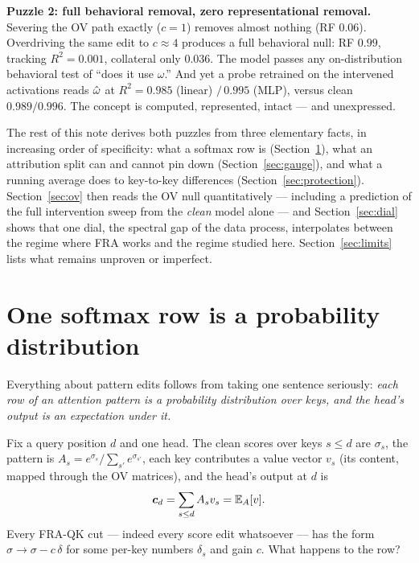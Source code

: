 \documentclass{article}
\begin{document}
\textbf{Puzzle 2: full behavioral removal, zero representational removal.} Severing the OV path exactly ($c = 1$) removes almost nothing (RF $0.06$). Overdriving the same edit to $c \approx 4$ produces a full behavioral null: RF $0.99$, tracking $R^2 = 0.001$, collateral only $0.036$. The model passes any on-distribution behavioral test of ``does it use $\omega$.'' And yet a probe retrained on the intervened activations reads $\hat{\omega}$ at $R^2 = 0.985$ (linear) $/\,0.995$ (MLP), versus clean $0.989/0.996$. The concept is computed, represented, intact --- and unexpressed.

The rest of this note derives both puzzles from three elementary facts, in increasing order of specificity: what a softmax row is (Section~\ref{sec:softmax}), what an attribution split can and cannot pin down (Section~\ref{sec:gauge}), and what a running average does to key-to-key differences (Section~\ref{sec:protection}). Section~\ref{sec:ov} then reads the OV null quantitatively --- including a prediction of the full intervention sweep from the \emph{clean} model alone --- and Section~\ref{sec:dial} shows that one dial, the spectral gap of the data process, interpolates between the regime where FRA works and the regime studied here. Section~\ref{sec:limits} lists what remains unproven or imperfect.

\section{One softmax row is a probability distribution}\label{sec:softmax}

Everything about pattern edits follows from taking one sentence seriously: \emph{each row of an attention pattern is a probability distribution over keys, and the head's output is an expectation under it.}

Fix a query position $d$ and one head. The clean scores over keys $s \le d$ are $\sigma_s$, the pattern is $A_s = e^{\sigma_s}/\sum_{s'} e^{\sigma_{s'}}$, each key contributes a value vector $v_s$ (its content, mapped through the OV matrices), and the head's output at $d$ is
\begin{equation*}
    \boldsymbol{c}_d = \sum_{s \le d} A_s v_s = \mathbb{E}_A[v] .
\end{equation*}
Every FRA-QK cut --- indeed every score edit whatsoever --- has the form $\sigma \to \sigma - c\,\delta$ for some per-key numbers $\delta_s$ and gain $c$. What happens to the row?
\end{document}
